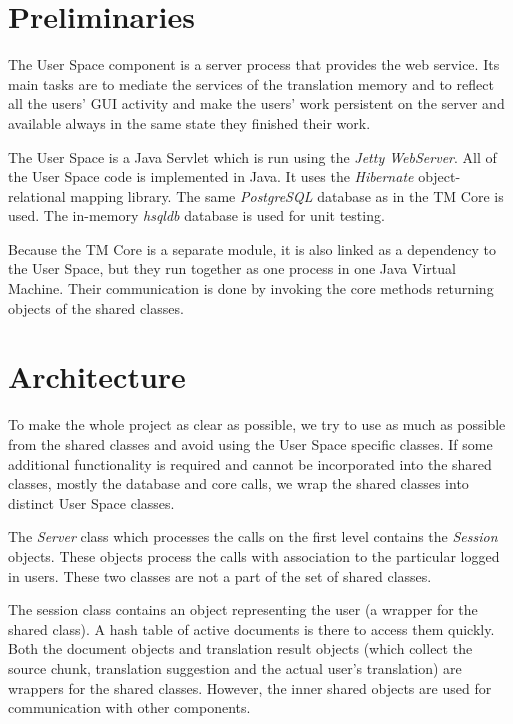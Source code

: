 \label{chap:userspace}
\section{Preliminaries}

The User Space component is a server process that provides the web service. Its main tasks are to mediate the services of the translation memory and to reflect all the users' GUI activity and make the users' work persistent on the server and available always in the same state they finished their work.

The User Space is a Java Servlet which is run using the \emph{Jetty WebServer}. All of the User Space code is implemented in Java. It uses the \emph{Hibernate} object-relational mapping library. The same \emph{PostgreSQL} database as in the TM Core is used. The in-memory \emph{hsqldb} database is used for unit testing.

Because the TM Core is a separate module, it is also linked as a dependency to the User Space, but they run together as one process in one Java Virtual Machine. Their communication is done by invoking the core methods returning objects of the shared classes.

\section{Architecture}

To make the whole project as clear as possible, we try to use as much as possible from the shared classes and avoid using the User Space specific classes. If some additional functionality is required and cannot be incorporated into the shared classes, mostly the database and core calls, we wrap the shared classes into distinct User Space classes.

The \emph{Server} class which processes the calls on the first level contains the {\it Session} objects. These objects process the calls with association to the particular logged in users. These two classes are not a part of the set of shared classes.

The session class contains an object representing the user (a wrapper for the shared class). A hash table of active documents is there to access  them quickly. Both the document objects and translation result objects (which collect the source chunk, translation suggestion and the actual user's translation) are wrappers for the shared classes. However, the inner shared objects are used for communication with other components.

